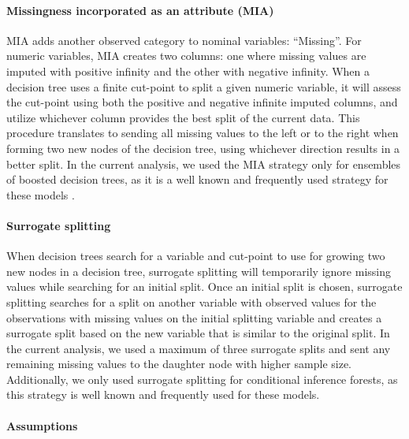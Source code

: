 \documentclass{article}
\begin{document}
\paragraph{Missingness incorporated as an attribute (MIA)}

MIA adds another observed category to nominal variables: ``Missing''.
For numeric variables, MIA creates two columns: one where missing values
are imputed with positive infinity and the other with negative infinity.
When a decision tree uses a finite cut-point to split a given numeric
variable, it will assess the cut-point using both the positive and
negative infinite imputed columns, and utilize whichever column provides
the best split of the current data. This procedure translates to sending
all missing values to the left or to the right when forming two new
nodes of the decision tree, using whichever direction results in a
better split. In the current analysis, we used the MIA strategy only for
ensembles of boosted decision trees, as it is a well known and
frequently used strategy for these models
\cite{twala2009empirical, ding2010investigation}.

\paragraph{Surrogate splitting}

When decision trees search for a variable and cut-point to use for
growing two new nodes in a decision tree, surrogate splitting will
temporarily ignore missing values while searching for an initial split.
Once an initial split is chosen, surrogate splitting searches for a
split on another variable with observed values for the observations with
missing values on the initial splitting variable and creates a surrogate
split based on the new variable that is similar to the original split.
In the current analysis, we used a maximum of three surrogate splits and
sent any remaining missing values to the daughter node with higher
sample size. Additionally, we only used surrogate splitting for
conditional inference forests, as this strategy is well known and
frequently used for these models.

\paragraph{Assumptions}
\end{document}
